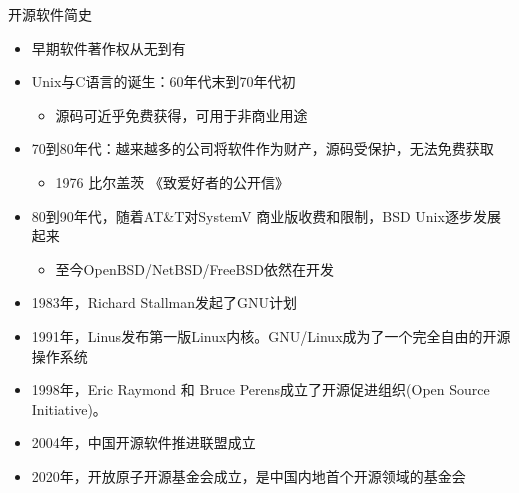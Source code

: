 \documentclass{beamer}
\begin{document}
\begin{frame}[label={sec:orgcea1471}]{开源软件简史}
\begin{itemize}
\item 早期软件著作权从无到有
\item Unix与C语言的诞生：60年代末到70年代初
\begin{itemize}
\item 源码可近乎免费获得，可用于非商业用途
\end{itemize}
\item 70到80年代：越来越多的公司将软件作为财产，源码受保护，无法免费获取
\begin{itemize}
\item 1976 比尔盖茨 《致爱好者的公开信》
\end{itemize}
\item 80到90年代，随着AT\&T对SystemV 商业版收费和限制，BSD Unix逐步发展起来
\begin{itemize}
\item 至今OpenBSD/NetBSD/FreeBSD依然在开发
\end{itemize}
\item 1983年，Richard Stallman发起了GNU计划
\item 1991年，Linus发布第一版Linux内核。GNU/Linux成为了一个完全自由的开源操作系统
\item 1998年，Eric Raymond 和 Bruce Perens成立了开源促进组织(Open Source Initiative)。
\item 2004年，中国开源软件推进联盟成立
\item 2020年，开放原子开源基金会成立，是中国内地首个开源领域的基金会
\end{itemize}
\end{frame}
\end{document}
